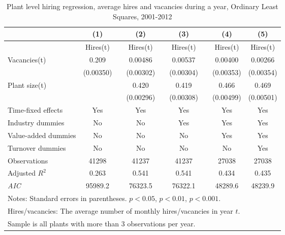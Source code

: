 \begin{table}[htbp]
\caption{\label{tab:robust_year_avg} Plant level hiring regression, average hires and vacancies during a year, Ordinary Least Squares,  2001-2012}
\begin{tabularx} {\textwidth} { l  cXcXcXcc}
\hline
       &   (1) &&     (2) &&    (3)       &&   (4)        &  (5)      \\
\hline
        &   \footnotesize{Hires(t)} &&     \footnotesize{Hires(t)} &&    \footnotesize{Hires(t)}      &&  \footnotesize{Hires(t)}       &    \footnotesize{Hires(t)}     \\
\hline
Vacancies(t) &      0.209\sym{***}&&     0.00486         &&     0.00537\sym{*} &&     0.00400         &     0.00266          \\
                    &   (0.00350)         &&   (0.00302)         &&  (0.00304)        &&   (0.00353)         &  (0.00354)          \\
Plant size(t)      &     &&                0.420\sym{***} &&       0.419\sym{***} &&       0.466\sym{***} &       0.469\sym{***} \\
                    &                   && (0.00296)         &&   (0.00308)         &&   (0.00499)         &   (0.00501)               \\
\hline
\footnotesize{Time-fixed effects}  & Yes                 && Yes                     &&           Yes          &&    Yes        &    Yes      \\
\footnotesize{Industry dummies}   & No                  && No                      &&     Yes                 &&    Yes        &  Yes      \\
\footnotesize{Value-added dummies} & No                  && No                      &&     No                 &&    Yes        &    Yes      \\
\footnotesize{Turnover dummies }   & No                  && No                      &&     No                 &&    No        &    Yes      \\
\hline
Observations        &    41298         &&       41237         &&       41237         &&       27038         &      27038      \\
Adjusted \(R^{2}\)  &     0.263         &&       0.541         &&       0.541         &&       0.434         &       0.435        \\
\textit{AIC}        &  95989.2         &&     76323.5         &&     76322.1         &&     48289.6         &     48239.9              \\
\hline\hline
\multicolumn{9}{l}{\footnotesize Notes: Standard errors in parentheses. \sym{*} \(p<0.05\), \sym{**} \(p<0.01\), \sym{***} \(p<0.001\).     }\\
\multicolumn{9}{l}{\footnotesize Hires/vacancies: The average number of monthly hires/vacancies in year $t$.}\\
\multicolumn{9}{l}{\footnotesize Sample is all plants with more than 3 observations per year.}\\
\end{tabularx}
\end{table}




